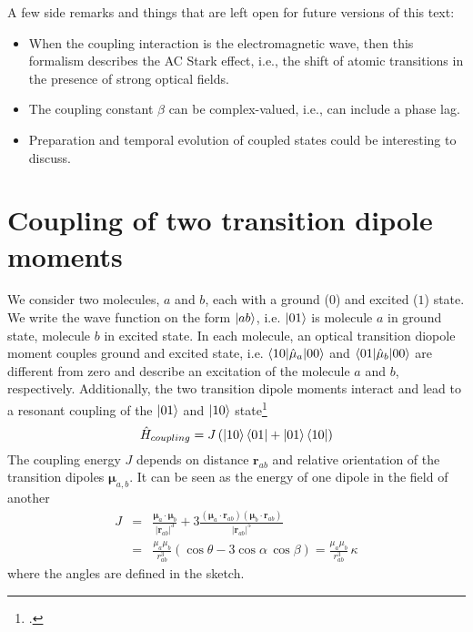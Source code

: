 A few side remarks and things that are left open for future versions of this text: 
\begin{itemize}
    \item When the coupling interaction is the electromagnetic wave, then this formalism describes the AC Stark effect, i.e., the shift of atomic transitions in the presence of strong optical fields.
    \item The coupling constant $\beta$ can be complex-valued, i.e., can include a phase lag.
    \item Preparation and temporal evolution of coupled states could be interesting to discuss.
\end{itemize}




\section{Coupling of two transition dipole moments}


We consider two molecules, $a$ and $b$, each with a ground ($0$) and excited ($1$) state. We write the wave function on the form $\ket{ab}$, i.e. $\ket{01}$ is molecule $a$ in ground state, molecule $b$ in excited state. In each molecule, an optical transition diopole moment couples ground and excited state, i.e. $\braket{10| \hat{\mu}_a | 00}$ and $\braket{01| \hat{\mu}_b | 00}$ are different from zero and describe an excitation of the molecule  $a$ and $b$, respectively. Additionally, the two transition dipole moments interact and lead to a resonant coupling of the 
$\ket{01}$ and $\ket{10}$ state\footcite{knoester-book}
\[
\hat{H}_{coupling} = J \left(  \ket{10}\bra{01} + \ket{01}\bra{10}  \right)
\]
The coupling energy $J$ depends on distance $\boldsymbol{r}_{ab}$ and relative orientation of the transition dipoles $\boldsymbol{\mu}_{a,b}$. It can be seen as the energy of one dipole in the field of another
\begin{eqnarray*}
 J & = & \frac{\boldsymbol{\mu}_a \cdot  \boldsymbol{\mu}_b }{|\boldsymbol{r}_{ab}|^3} 
  + 3 \frac{ (\boldsymbol{\mu}_a \cdot  \boldsymbol{r}_{ab})  (\boldsymbol{\mu}_b \cdot  \boldsymbol{r}_{ab})
  }{ |\boldsymbol{r}_{ab}|^5 } \\
   & = & \frac{\mu_a \mu_b }{r_{ab}^3} \left( \cos \theta - 3 \cos \alpha \, \cos \beta \right)  = \frac{\mu_a \mu_b }{r_{ab}^3} \, \kappa
\end{eqnarray*}
where the angles are defined in the sketch.


